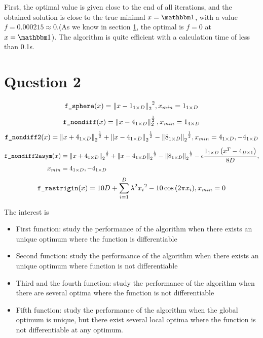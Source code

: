 \documentclass{CSArticle}[english]
\begin{document}
First, the optimal value is given close to the end of all iterations, and the obtained solution is close to the true minimal $x=\Onebb$, with a value $f=0.000215 \approx 0$.(As we know in section \ref{Q2}, the optimal is $f=0$ at $x=\Onebb$). The algorithm is quite efficient with a calculation time of less than 0.1s. 

\section{Question 2}
\label{Q2}
\begin{equation}
    \verb|f_sphere|(x)={\left\| x-1_{1\times D} \right\| _2}^2, x_{min}=1_{1\times D}
\end{equation}
\begin{equation}
    \verb|f_nondiff|(x)=\left\| x-4_{1\times D} \right\| _2^{\frac{1}{2}}, x_{min}=1_{4\times D}
    \end{equation}
\begin{equation}
    \verb|f_nondiff2|(x)={\left\| x+4_{1\times D} \right\| _2}^{\frac{1}{2}}+{\left\| x-4_{1\times D} \right\| _2}^{\frac{1}{2}}-{\left\| 8_{1\times D} \right\| _2}^{\frac{1}{2}}, 
    x_{min}=4_{1\times D}, -4_{1\times D}
    \end{equation}
\begin{equation}
\begin{aligned}
    \verb|f_nondiff2asym|(x)&={\left\| x+4_{1\times D} \right\| _2}^{\frac{1}{2}}+{\left\| x-4_{1\times D} \right\| _2}^{\frac{1}{2}}-{\left\| 8_{1\times D} \right\| _2}^{\frac{1}{2}}-\epsilon \frac{1_{1\times D}\left( x^T-4_{D\times 1} \right)}{8D},\\
    x_{min}&=4_{1\times D}, -4_{1\times D}
    \end{aligned}
\end{equation}
\begin{equation}
    \verb|f_rastrigin|(x)=10D+\sum_{i=1}^D{\lambda ^2{x_i}^2-10\cos \left( 2\pi x_i \right)}\textbf{},
    x_{min}=0
\end{equation}


The interest is 

\begin{itemize}
    \item First function: study the performance of the algorithm when there exists an unique optimum where the function is differentiable
    \item Second function: study the performance of the algorithm when there exists an unique optimum where function is not differentiable 
    \item Third and the fourth function: study the performance of the algorithm when there are several optima where the function is not differentiable
    \item Fifth function: study the performance of the algorithm when the global optimum is unique, but there exist several local optima where the function is not differentiable at any optimum.
\end{itemize}
\end{document}

